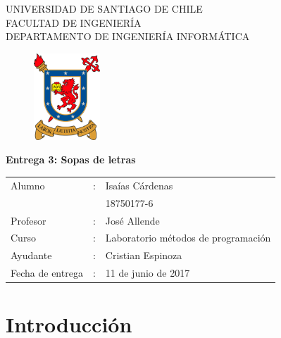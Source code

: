 \documentclass[letterpaper,12pt]{report}
\begin{document}
\renewcommand{\contentsname}{Tabla de Contenido}
\begin{titlepage}
\begin{center}
UNIVERSIDAD DE SANTIAGO DE CHILE\\
FACULTAD DE INGENIERÍA\\
DEPARTAMENTO DE INGENIERÍA INFORMÁTICA\\
\begin{figure}[htb]
\begin{center}
\includegraphics[width=2.5cm]{logo.png}
\end{center}
\end{figure}

\vspace*{0.7in}
\begin{Large}
\textbf{Entrega 3: Sopas de letras} \\
\end{Large}
\vspace*{0.3in}

\vspace*{2in}

\end{center}
\begin{flushright}

\begin{tabular}{lll}
Alumno & : & Isaías Cárdenas\\
            &   & 18750177-6\\
Profesor & : & José Allende\\
Curso & : & Laboratorio métodos de programación\\
Ayudante & : & Cristian Espinoza\\
Fecha de entrega & : & 11 de junio de 2017
\end{tabular}
\end{flushright}
\end{titlepage}

\tableofcontents

\chapter{Introducci\'on}
\end{document}
